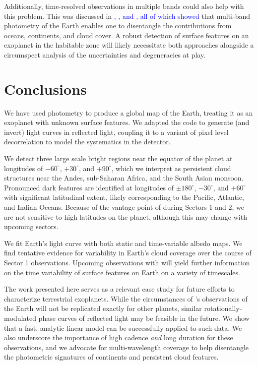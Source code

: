 \documentclass[modern]{aastex62}
\newcommand{\edited}[1]{\textcolor{blue}{#1}}
\begin{document}
Additionally, time-resolved observations in multiple bands could
also help with this problem. This was discussed in \cite{Cowan2009}%
\edited{, \cite{Kawahara2011}, and \cite{Fujii2012}, all of which showed }%
that multi-band photometry of the Earth enables one to
disentangle the contributions from oceans, continents, and cloud cover.
A robust detection of surface features on an exoplanet in the habitable
zone will likely necessitate both approaches alongside a circumspect
analysis of the uncertainties and degeneracies at play.

\section{Conclusions}
\label{sec:conclusions}

We have used \TESS photometry to
produce a global map of the Earth, treating it as an exoplanet with unknown
surface features. We adapted the \starry code to 
generate (and invert) light curves in reflected light, coupling it
to a variant of pixel level decorrelation to model the systematics
in the \TESS detector. 

We detect three large scale bright regions near
the equator of the planet at longitudes of 
$-60^\circ$, $+30^\circ$, and $+90^\circ$, 
which we interpret as persistent cloud structures 
near the Andes, sub-Saharan Africa, and the South Asian monsoon. 
Pronounced dark features are identified
at longitudes of $\pm 180^\circ$, $-30^\circ$, and $+60^\circ$ with
significant latitudinal extent, likely corresponding to 
the Pacific, Atlantic, and Indian Oceans. Because of the
vantage point of \TESS during Sectors 1 and 2, we are not sensitive to
high latitudes on the planet, although this may change with upcoming
sectors. 

We fit Earth's light curve with both static and time-variable albedo maps. 
We find tentative evidence for variability in Earth's cloud coverage over 
the course of Sector 1 observations. 
Upcoming observations with \TESS will yield further information on 
the time variability of surface features on Earth on a variety of timescales.


The work presented here serves as a relevant case study for future 
efforts to characterize terrestrial exoplanets. While the circumstances of \TESS's 
observations of the Earth will not be replicated exactly for other planets, similar 
rotationally-modulated phase curves of reflected light may be feasible in the future. 
We show that a fast, analytic linear model can be successfully applied to such data. 
We also underscore the importance of high cadence \emph{and} long duration for 
these observations, and we advocate for multi-wavelength coverage to 
help disentangle the photometric signatures of continents and persistent cloud features.
\end{document}
